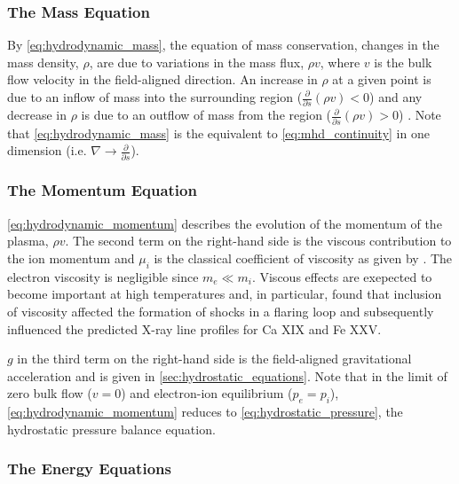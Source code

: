 \subsubsection{The Mass Equation}\label{sec:hydrodynamic-mass}

By \autoref{eq:hydrodynamic_mass}, the equation of mass conservation, changes in the mass density, $\rho$, are due to variations in the mass flux, $\rho v$, where $v$ is the bulk flow velocity in the field-aligned direction. An increase in $\rho$ at a given point is due to an inflow of mass into the surrounding region ($\frac{\partial}{\partial s}(\rho v) < 0$) and any decrease in $\rho$ is due to an outflow of mass from the region ($\frac{\partial}{\partial s}(\rho v) > 0$) \citep{priest_magnetohydrodynamics_2014}. Note that \autoref{eq:hydrodynamic_mass} is the equivalent to \autoref{eq:mhd_continuity} in one dimension (i.e. $\nabla\to\frac{\partial}{\partial s}$).

\subsubsection{The Momentum Equation}\label{sec:hydrodynamic-momentum}

\autoref{eq:hydrodynamic_momentum} describes the evolution of the momentum of the plasma, $\rho v$. The second term on the right-hand side is the viscous contribution to the ion momentum and $\mu_i$ is the classical coefficient of viscosity as given by \citet{spitzer_physics_1962}. The electron viscosity is negligible since $m_e\ll m_i$. Viscous effects are exepected to become important at high temperatures \citep{bradshaw_what_2011} and, in particular, \citet{peres_importance_1993} found that inclusion of viscosity affected the formation of shocks in a flaring loop and subsequently influenced the predicted X-ray line profiles for Ca XIX and Fe XXV. 

$g$ in the third term on the right-hand side is the field-aligned gravitational acceleration and is given in \autoref{sec:hydrostatic_equations}. Note that in the limit of zero bulk flow ($v=0$) and electron-ion equilibrium ($p_e=p_i$), \autoref{eq:hydrodynamic_momentum} reduces to \autoref{eq:hydrostatic_pressure}, the hydrostatic pressure balance equation.

\subsubsection{The Energy Equations}\label{sec:hydrodynamic-energy}

